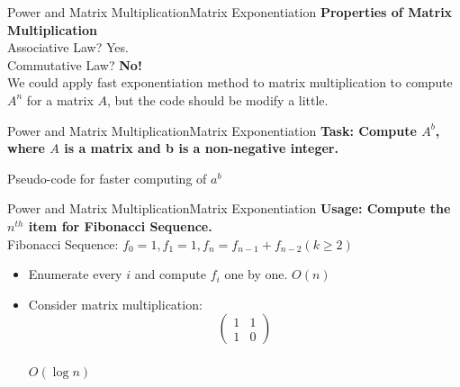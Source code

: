 \documentclass[mathserif,10pt]{beamer}
\begin{document}
\begin{frame}{Power and Matrix Multiplication}{Matrix Exponentiation}
\textbf{\large Properties of Matrix Multiplication} \\[0.5cm]
\pause
Associative Law? \pause Yes. \\
\pause
Commutative Law? \pause \textbf{No!} \\[0.5cm]
We could apply fast exponentiation method to matrix multiplication to compute $A^n$ for a matrix $A$, but the code should be modify a little.
\end{frame}


\begin{frame}{Power and Matrix Multiplication}{Matrix Exponentiation}
\textbf{\large Task: Compute $A ^ b$, where $A$ is a matrix and b is a non-negative integer.}
\begin{algorithm}[H]
\begin{algorithmic}[1]
\ELSE
	\ENDIF
\ENDIF
\end{algorithmic}
\caption*{Pseudo-code for faster computing of $a^b$}
\end{algorithm}
\end{frame}

\begin{frame}{Power and Matrix Multiplication}{Matrix Exponentiation}
\textbf{\large Usage: Compute the $n^{th}$ item for Fibonacci Sequence.} \\[0.5cm]
Fibonacci Sequence: $f_0 = 1, f_1 = 1, f_n = f_{n-1} + f_{n-2} (k \geq 2)$ \\[0.5cm]
\begin{itemize}
	\item Enumerate every $i$ and compute $f_i$ one by one. \pause $O(n)$
	\pause
	\item Consider matrix multiplication:
	\begin{equation}
	\left(
	\begin{array}{cc}
		1 & 1 \\
		1 & 0
	\end{array}
	\right) \nonumber
	\end{equation}
	\\
	\pause $O(\log n) $
\end{itemize}
\end{frame}
\end{document}
